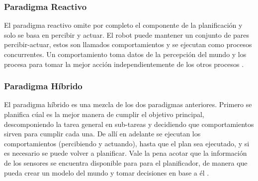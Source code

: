 \subsubsection{Paradigma Reactivo}
El paradigma reactivo omite por completo el componente de la planificación y solo se basa en percibir y actuar. El robot puede mantener un conjunto de pares percibir-actuar, estos son llamados comportamientos y se ejecutan como procesos concurrentes. Un comportamiento toma datos de la percepción del mundo y los procesa para tomar la mejor acción independientemente de los otros procesos \cite{AiRobotics}.

\subsubsection{Paradigma Híbrido}
El paradigma híbrido es una mezcla de los dos paradigmas anteriores. Primero se planifica cúal es la mejor manera de cumplir el objetivo principal, descomponiendo la tarea general en sub-tareas y decidiendo que comportamientos sirven para cumplir cada una. De allí en adelante se ejecutan los comportamientos (percibiendo y actuando), hasta que el plan sea ejecutado, y si es necesario se puede volver a planificar. Vale la pena acotar que la información de los sensores se encuentra disponible para para el planificador, de manera que pueda crear un modelo del mundo y tomar decisiones en base a él  \cite{AiRobotics}. 
